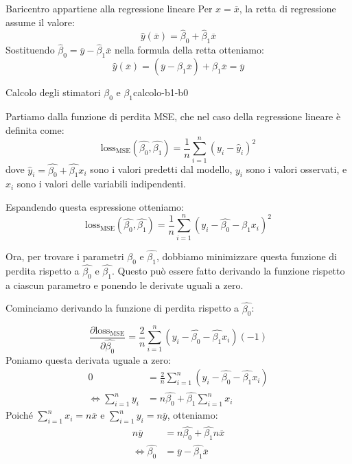 \begin{dimostrazione}{Baricentro appartiene alla regressione lineare}{}
Per \( x = \overline{x} \), la retta di regressione assume il valore:
\[
\hat{y}(\overline{x}) = \hat{\beta}_0 + \hat{\beta}_1 \overline{x}
\]
Sostituendo \( \hat{\beta}_0 = \overline{y} - \hat{\beta}_1 \overline{x} \) nella formula della retta otteniamo:
\[
\hat{y}(\overline{x}) = \left( \overline{y} - \hat{\beta}_1 \overline{x} \right) + \hat{\beta}_1 \overline{x} = \overline{y}
\]
\end{dimostrazione}

\begin{dimostrazione}{Calcolo degli stimatori \( \beta_0 \) e \( \beta_1 \)}{calcolo-b1-b0}

Partiamo dalla funzione di perdita MSE, che nel caso della regressione lineare è definita come:
\[
\text{loss}_{\text{MSE}} (\hat{\beta_0}, \hat{\beta_1}) = \frac{1}{n} \sum_{i=1}^n \left( y_i - \hat{y}_i \right)^2
\]
dove \( \hat{y}_i = \hat{\beta_0} + \hat{\beta_1} x_i \) sono i valori predetti dal modello, \( y_i \) sono i valori osservati, e \( x_i \) sono i valori delle variabili indipendenti.

Espandendo questa espressione otteniamo:
\[
\text{loss}_{\text{MSE}} (\hat{\beta_0}, \hat{\beta_1}) = \frac{1}{n} \sum_{i=1}^n \left( y_i - \hat{\beta_0} - \hat{\beta_1} x_i \right)^2
\]

Ora, per trovare i parametri \( \hat{\beta_0} \) e \( \hat{\beta_1} \), dobbiamo minimizzare questa funzione di perdita rispetto a \( \hat{\beta_0} \) e \( \hat{\beta_1} \). Questo può essere fatto derivando la funzione rispetto a ciascun parametro e ponendo le derivate uguali a zero.

Cominciamo derivando la funzione di perdita rispetto a \( \hat{\beta_0} \):

\[
    \frac{\partial \text{loss}_{\text{MSE}}}{\partial \hat{\beta_0}} = \frac{2}{n} \sum_{i=1}^n \left( y_i - \hat{\beta_0} - \hat{\beta_1} x_i \right) (-1)
\]
Poniamo questa derivata uguale a zero:
\begin{align*}
    0 &= \frac{2}{n} \sum_{i=1}^n \left( y_i - \hat{\beta_0} - \hat{\beta_1} x_i \right)\\
    \Leftrightarrow \sum_{i=1}^n y_i &= n \hat{\beta_0} + \hat{\beta_1} \sum_{i=1}^n x_i
\end{align*}
Poiché \( \sum_{i=1}^n x_i = n \overline{x} \) e \( \sum_{i=1}^n y_i = n \overline{y} \), otteniamo:
\begin{align*}
    n \overline{y} &= n \hat{\beta_0} + \hat{\beta_1} n \overline{x}\\
    \Leftrightarrow \hat{\beta_0} &= \overline{y} - \hat{\beta_1} \overline{x}
\end{align*}


\end{dimostrazione}

